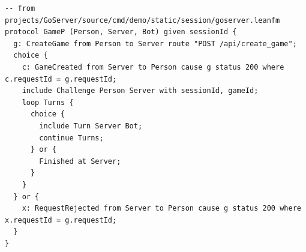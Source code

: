 \begin{lstlisting}[language={},basicstyle=\ttfamily\footnotesize,breaklines=true]
-- from projects/GoServer/source/cmd/demo/static/session/goserver.leanfm
protocol GameP (Person, Server, Bot) given sessionId {
  g: CreateGame from Person to Server route "POST /api/create_game";
  choice {
    c: GameCreated from Server to Person cause g status 200 where c.requestId = g.requestId;
    include Challenge Person Server with sessionId, gameId;
    loop Turns {
      choice {
        include Turn Server Bot;
        continue Turns;
      } or {
        Finished at Server;
      }
    }
  } or {
    x: RequestRejected from Server to Person cause g status 200 where x.requestId = g.requestId;
  }
}
\end{lstlisting}
